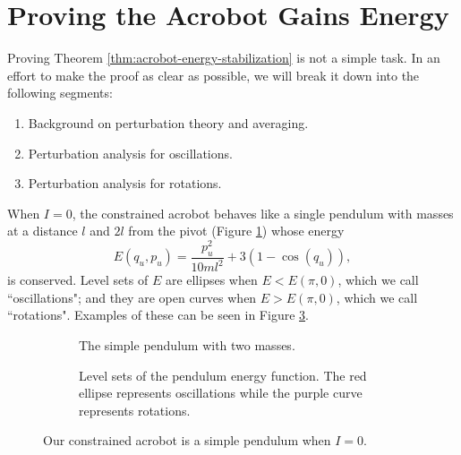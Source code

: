 \section{Proving the Acrobot Gains Energy}\label{sec:acrobot-proof}
Proving Theorem \ref{thm:acrobot-energy-stabilization} is not a simple task.
In an effort to make the proof as clear as possible, we will break it down into
the following segments:
\begin{enumerate}
    \item Background on perturbation theory and averaging.
    \item Perturbation analysis for oscillations.
    \item Perturbation analysis for rotations.
\end{enumerate}

When \(I = 0\), the constrained acrobot behaves like a single
pendulum with masses at a distance \(l\) and \(2l\) from the pivot 
(Figure \ref{fig:acrobot-I0}) whose energy
\begin{equation}\label{eqn:acrobot-nominal-E}
    E(q_u,p_u) = \frac{p_u^2}{10ml^2} + 3(1 - \cos(q_u))
    ,
\end{equation}
is conserved.
Level sets of \(E\) are ellipses when \(E < E(\pi,0)\), which we call
``oscillations"; and they are open curves when \(E > E(\pi,0)\), which we call
``rotations". 
Examples of these can be seen in Figure \ref{fig:pendulum-level-sets}.

\begin{figure}
    \centering
    \begin{subfigure}[t]{0.45\textwidth}
        \caption{The simple pendulum with two masses.}
        \label{fig:acrobot-I0}
    \end{subfigure}
    \hfill
    \begin{subfigure}[t]{0.45\textwidth}
        \caption{Level sets of the pendulum energy function.
            The red ellipse represents oscillations while the purple curve
            represents rotations.}
        \label{fig:pendulum-level-sets}
    \end{subfigure}
    \caption{Our constrained acrobot is a simple pendulum when \(I = 0\).}
\end{figure}

